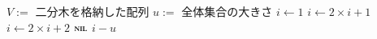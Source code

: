 \documentclass[main]{subfiles}
\begin{document}
\begin{algorithm}[H]
\caption{$\Min(V)$}
\begin{algorithmic}[1]
\scriptsize
\Require
	\Statex	$V :=$ 二分木を格納した配列
	\Statex $u :=$ 全体集合の大きさ
	\State $i \gets 1$
			\State $i \gets 2\times i + 1$
			\State $i \gets 2\times i + 2$
		\Else
			\State \Return $\text{\textsc{nil}}$
		\EndIf
	\EndWhile
	\State \Return $i - u$
\EndFunction
\end{algorithmic}
\end{algorithm}
\end{document}
